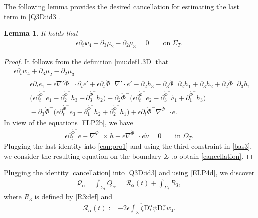 \documentclass[twoside,11pt]{article}
\numberwithin{equation}{section}
\newtheorem{lemma}{Lemma}[section]
\def\p{\partial}
\begin{document}
The following lemma provides the desired cancellation for estimating the last term in \eqref{Q3D:id3}.
\begin{lemma}
It holds that
\begin{align}
	\label{cancellation}
		\epsilon \p_t {w_4}+\p_3\mu_2-\p_2\mu_3=0\qquad \textrm{on } \Sigma_{T}.
\end{align}
\end{lemma}
\begin{proof}
It follows from the definition \eqref{mu:def1.3D} that
\begin{align} \nonumber
 &	\epsilon \p_t {w_4}+\p_3\mu_2-\p_2\mu_3\\
\nonumber & \quad	=
	\epsilon \p_t e_1-\epsilon \nabla'\mathring{\Phi}^-\cdot \p_t e'
	+\epsilon \p_t\mathring{\Phi}^-\nabla'\cdot  e'
		-\p_2h_3-\p_3\mathring{\Phi}^-\p_2 h_1
	+\p_3h_2+ \p_2\mathring{\Phi}^-\p_3 h_1\\
\nonumber & \quad	=
\big(	\epsilon \p_t^{\mathring{\Phi}^-} e_1-\p_2^{\mathring{\Phi}^-} h_3+\p_3^{\mathring{\Phi}^-} h_2\big)
	-\p_2  \mathring{\Phi}^- \big( 	\epsilon \p_t^{\mathring{\Phi}^-} e_2-\p_3^{\mathring{\Phi}^-} h_1+\p_1^{\mathring{\Phi}^-} h_3 \big)\\
&\qquad\; 	  -\p_3  \mathring{\Phi}^- \big( 	\epsilon \p_t^{\mathring{\Phi}^-} e_3-\p_1^{\mathring{\Phi}^-} h_2+\p_2^{\mathring{\Phi}^-} h_1 \big)
+\epsilon\p_t  \mathring{\Phi}^-
\nabla^{\mathring{\Phi}^-} \cdot e.
\label{can:pro1}
\end{align}	
In view of the equations \eqref{ELP2b}, we have
\begin{align} \nonumber
	\epsilon \p_t^{\mathring{\Phi}^-}e-\nabla^{\mathring{\Phi}^-}\times h+\epsilon \nabla^{\mathring{\Phi}^-}\cdot e \mathring{\nu}=0\qquad  \textrm{in }\Omega_T.
\end{align}
Plugging the last identity into \eqref{can:pro1} and using the third constraint in \eqref{bas3},
we consider the resulting equation on the boundary $\Sigma$ to obtain \eqref{cancellation}.
\end{proof}
Plugging the identity \eqref{cancellation} into \eqref{Q3D:id3} and using \eqref{ELP4d}, we discover
\begin{align} \label{Q:es1}
	\mathcal{Q}_{\alpha}=\int_{\Sigma_t}{Q}_{\alpha}=
	\mathcal{R}_{\alpha}(t)+
	\int_{\Sigma_{t}}R_3,
\end{align}
where $R_3$ is defined by \eqref{R3:def} and
\begin{align}\label{R.cal:def}
	\mathcal{R}_{\alpha}(t):=-2\epsilon \int_{\Sigma} \mathring{\zeta}
	\mathrm{D}_*^{\alpha} \psi\mathrm{D}_*^{\alpha} {w_4}.
\end{align}
\end{document}
